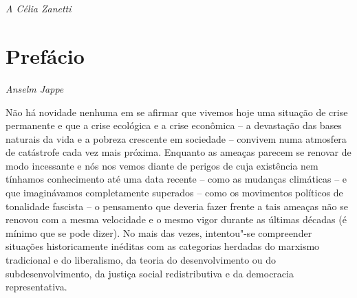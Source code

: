 

\chapter*{}

\vspace*{\fill}

\thispagestyle{empty}
\begin{flushright}
\emph{A Célia Zanetti}
\end{flushright}

\chapter{Prefácio}


\begin{flushright}
\emph{Anselm Jappe}
\end{flushright}

Não há novidade nenhuma em se afirmar que vivemos hoje uma situação de
crise permanente e que a crise ecológica e a crise econômica -- a
devastação das bases naturais da vida e a pobreza crescente em sociedade
-- convivem numa atmosfera de catástrofe cada vez mais próxima. Enquanto
as ameaças parecem se renovar de modo incessante e nós nos vemos diante
de perigos de cuja existência nem tínhamos conhecimento até uma data
recente -- como as mudanças climáticas -- e que imaginávamos
completamente superados -- como os movimentos políticos de tonalidade
fascista -- o pensamento que deveria fazer frente a tais ameaças não se
renovou com a mesma velocidade e o mesmo vigor durante as últimas
décadas (é mínimo que se pode dizer). No mais das vezes, intentou"-se
compreender situações historicamente inéditas com as categorias herdadas
do marxismo tradicional e do liberalismo, da teoria do desenvolvimento
ou do subdesenvolvimento, da justiça social redistributiva e da
democracia representativa.

